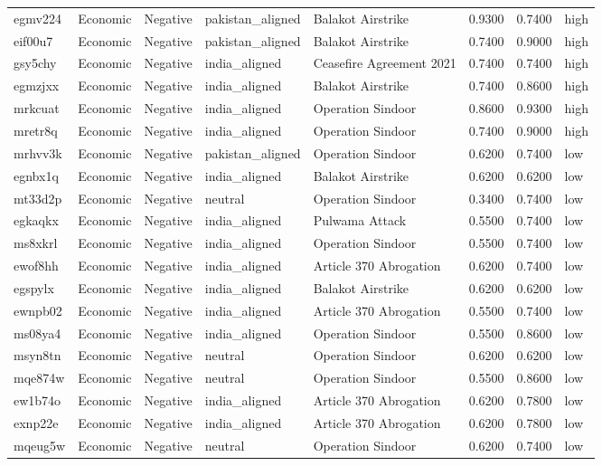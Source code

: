 \begin{longtable}{lllllrrl}
egmv224 & Economic & Negative & pakistan\_aligned & Balakot Airstrike & 0.9300 & 0.7400 & high \\
eif00u7 & Economic & Negative & pakistan\_aligned & Balakot Airstrike & 0.7400 & 0.9000 & high \\
gsy5chy & Economic & Negative & india\_aligned & Ceasefire Agreement 2021 & 0.7400 & 0.7400 & high \\
egmzjxx & Economic & Negative & india\_aligned & Balakot Airstrike & 0.7400 & 0.8600 & high \\
mrkcuat & Economic & Negative & india\_aligned & Operation Sindoor & 0.8600 & 0.9300 & high \\
mretr8q & Economic & Negative & india\_aligned & Operation Sindoor & 0.7400 & 0.9000 & high \\
mrhvv3k & Economic & Negative & pakistan\_aligned & Operation Sindoor & 0.6200 & 0.7400 & low \\
egnbx1q & Economic & Negative & india\_aligned & Balakot Airstrike & 0.6200 & 0.6200 & low \\
mt33d2p & Economic & Negative & neutral & Operation Sindoor & 0.3400 & 0.7400 & low \\
egkaqkx & Economic & Negative & india\_aligned & Pulwama Attack & 0.5500 & 0.7400 & low \\
ms8xkrl & Economic & Negative & india\_aligned & Operation Sindoor & 0.5500 & 0.7400 & low \\
ewof8hh & Economic & Negative & india\_aligned & Article 370 Abrogation & 0.6200 & 0.7400 & low \\
egspylx & Economic & Negative & india\_aligned & Balakot Airstrike & 0.6200 & 0.6200 & low \\
ewnpb02 & Economic & Negative & india\_aligned & Article 370 Abrogation & 0.5500 & 0.7400 & low \\
ms08ya4 & Economic & Negative & india\_aligned & Operation Sindoor & 0.5500 & 0.8600 & low \\
msyn8tn & Economic & Negative & neutral & Operation Sindoor & 0.6200 & 0.6200 & low \\
mqe874w & Economic & Negative & neutral & Operation Sindoor & 0.5500 & 0.8600 & low \\
ew1b74o & Economic & Negative & india\_aligned & Article 370 Abrogation & 0.6200 & 0.7800 & low \\
exnp22e & Economic & Negative & india\_aligned & Article 370 Abrogation & 0.6200 & 0.7800 & low \\
mqeug5w & Economic & Negative & neutral & Operation Sindoor & 0.6200 & 0.7400 & low \\

\end{longtable}
